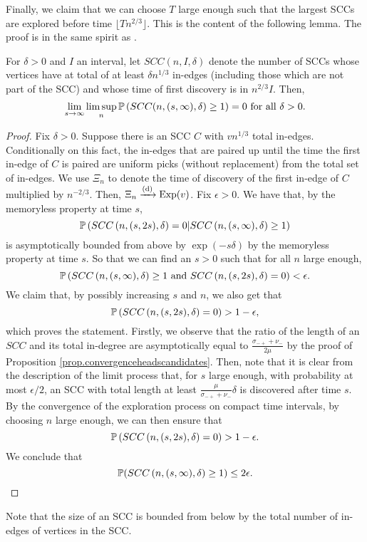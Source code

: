 Finally, we claim that we can choose $T$ large enough such that the largest SCCs are explored before time $\lfloor Tn^{2/3}\rfloor$. This is the content of the following lemma. The proof is in the same spirit as \citet[Lemma 9]{aldous_1991}.
\begin{lemma}\label{lemma.largesccfoundfirst}
For $\delta>0$ and $I$ an interval, let $SCC(n,I,\delta)$ denote the number of SCCs whose vertices have at total of at least $\delta n^{1/3}$ in-edges (including those which are not part of the SCC) and whose time of first discovery is in $n^{2/3}I$. Then,
$$\lim_{s\to \infty}\limsup_{n} \P\left(SCC(n,(s,\infty),\delta)\geq 1\right)=0\text{ for all }\delta>0.$$
\end{lemma}
\begin{proof}
Fix $\delta>0$. Suppose there is an SCC $C$ with $vn^{1/3}$ total in-edges. Conditionally on this fact, the in-edges that are paired up until the time the first in-edge of $C$ is paired are uniform picks (without replacement) from the total set of in-edges. We use $\Xi_n$ to denote the time of discovery of the first in-edge of $C$ multiplied by $n^{-2/3}$. Then, $\Xi_n\todist\operatorname{Exp}(v)$. Fix $\epsilon>0$. We have that, by the memoryless property at time $s$,
$$\P\left(SCC\left(n,(s,2s),\delta\right)=0|SCC\left(n,(s,\infty),\delta\right)\geq 1\right)$$
is asymptotically bounded from above by 
$\exp(-s\delta)$ by the memoryless property at time $s$. So that we can find an $s>0$ such that for all $n$ large enough,
$$\P\left(SCC\left(n,(s,\infty),\delta\right)\geq 1 \text{ and }SCC\left(n,(s,2s),\delta\right)=0\right)<\epsilon.$$
We claim that, by possibly increasing $s$ and $n$, we also get that 
$$\P\left(SCC\left(n,(s,2s),\delta\right)=0\right)>1-\epsilon,$$
which proves the statement.
Firstly, we observe that the ratio of the length of an $SCC$ and its total in-degree are asymptotically equal to $\frac{\sigma_{-+}+\nu_-}{2\mu}$ by the proof of Proposition \ref{prop.convergenceheadscandidates}. Then, note that it is clear from the description of the limit process that, for $s$ large enough, with probability at most $\epsilon/2$, an SCC with total length at least $\frac{\mu}{\sigma_{-+}+\nu_-}\delta$ is discovered after time $s$. By the convergence of the exploration process on compact time intervals, by choosing $n$ large enough, we can then ensure that 
$$\P\left(SCC\left(n,(s,2s),\delta\right)=0\right)>1-\epsilon.$$
We conclude that 
\begin{equation*}
    \P(SCC\left(n,(s,\infty),\delta\right)\geq 1)\leq 2\epsilon. \qedhere
\end{equation*}
\end{proof}
Note that the size of an SCC is bounded from below by the total number of in-edges of vertices in the SCC.

